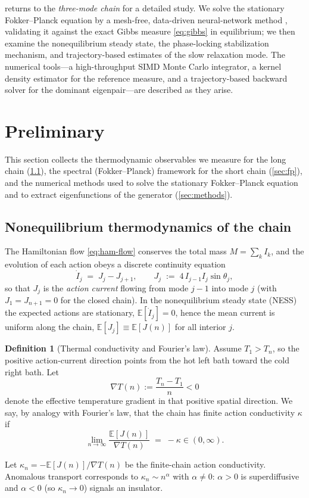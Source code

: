 \documentclass[11pt,a4paper]{article}
\theoremstyle{definition}
\newtheorem{definition}[theorem]{Definition}
\newcommand{\E}{\mathbb{E}}
\numberwithin{equation}{section}   %
\begin{document}
 returns to the \emph{three-mode chain} for a detailed
study. We solve the stationary Fokker--Planck equation by a mesh-free,
data-driven neural-network method \cite{ZhaiDobsonLi}, validating it against the
exact Gibbs measure \eqref{eq:gibbs} in equilibrium; we then examine the
nonequilibrium steady state, the phase-locking stabilization mechanism, and
trajectory-based estimates of the slow relaxation mode. The numerical tools---a
high-throughput SIMD Monte Carlo integrator, a kernel density estimator for the
reference measure, and a trajectory-based backward solver for the dominant
eigenpair---are described as they arise.


\section{Preliminary}

This section collects the thermodynamic observables we measure for the long
chain (\cref{sec:thermo}), the spectral (Fokker--Planck) framework for the
short chain (\cref{sec:fp}), and the numerical methods used to solve the
stationary Fokker--Planck equation and to extract eigenfunctions of the
generator (\cref{sec:methods}).

\subsection{Nonequilibrium thermodynamics of the chain}\label{sec:thermo}

The Hamiltonian flow \eqref{eq:ham-flow} conserves the total mass
$M=\sum_k I_k$, and the evolution of each action obeys a discrete continuity
equation
\begin{equation}\label{eq:continuity}
  \dot I_j \;=\; J_j - J_{j+1},
  \qquad
  J_j \;:=\; 4\, I_{j-1} I_j \sin\theta_j ,
\end{equation}
so that $J_j$ is the \emph{action current} flowing from mode $j-1$ into mode
$j$ (with $J_1=J_{n+1}=0$ for the closed chain). In the nonequilibrium steady
state (NESS) the expected actions are stationary, $\E[\dot I_j]=0$, hence the
mean current is uniform along the chain, $\E[J_j]\equiv \E[J(n)]$ for all interior
$j$.

\begin{definition}[Thermal conductivity and Fourier's law]\label{de:fourier}
Assume $T_1>T_n$, so the positive action-current direction points from the hot
left bath toward the cold right bath. Let
\[
  \nabla T(n):=\frac{T_n-T_1}{n}<0
\]
denote the effective temperature gradient in that positive spatial direction.
We say, by analogy with Fourier's law, that the chain has finite action
conductivity $\kappa$ if
\begin{equation}\label{eq:fourier}
  \lim_{n \rightarrow \infty}\frac{\E[J(n)]}{\nabla T(n)} \;=\; -
  \kappa \in (0,\infty).
\end{equation}

Let $\kappa_n = -\E[J(n)]/\nabla T(n)$ be the finite-chain action
conductivity. Anomalous transport corresponds to $\kappa_n\sim n^{\alpha}$ with
$\alpha\neq0$:
$\alpha>0$ is superdiffusive and $\alpha<0$ (so $\kappa_n\to0$) signals an
insulator.
\end{definition}
\end{document}
